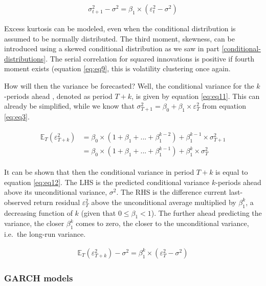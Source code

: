 \documentclass[a4paper, nobind]{templates/ociamthesis}
\begin{document}
\begin{align} 
\sigma_{t+1}^2 - \sigma^2 = \beta_1\times(\varepsilon_t^2 - \sigma^2)
 \label{eq:eq10}
\end{align}

\noindent Excess kurtosis can be modeled, even when the conditional distribution is assumed to be normally distributed. The third moment, skewness, can be introduced using a skewed conditional distribution as we saw in part \ref{conditional-distributions}. The serial correlation for squared innovations is positive if fourth moment exists (equation \eqref{eq:eq9}, this is volatility clustering once again.

\noindent How will then the variance be forecasted? Well, the conditional variance for the \(k\)-periods ahead , denoted as period \(T+k\), is given by equation \eqref{eq:eq11}. This can already be simplified, while we know that \(\sigma_{T+1}^2 = \beta_0 + \beta_1 \times \varepsilon_T^2\) from equation \eqref{eq:eq3}.

\begin{align} 
\begin{split}
\mathbb{E}_T(\varepsilon_{T+k}^2) 
&= \beta_0\times(1+\beta_1 + ... + \beta_1^{k-2}) + \beta_1^{k-1}\times\sigma_{T+1}^2 \\
&= \beta_0\times(1+\beta_1 + ... + \beta_1^{k-1}) + \beta_1^{k}\times\sigma_{T}^2
\end{split}
 \label{eq:eq11}
\end{align}

\noindent It can be shown that then the conditional variance in period \(T+k\) is equal to equation \eqref{eq:eq12}. The LHS is the predicted conditional variance \(k\)-periods ahead above its unconditional variance, \(\sigma^2\). The RHS is the difference current last-observed return residual \(\varepsilon_T^2\) above the unconditional average multiplied by \(\beta_1^k\), a decreasing function of \(k\) (given that \(0 \le\beta_1 <1\)). The further ahead predicting the variance, the closer \(\beta_1^k\) comes to zero, the closer to the unconditional variance, i.e.~the long-run variance.

\begin{align} 
\mathbb{E}_T(\varepsilon_{T+k}^2) - \sigma^2 = \beta_1^k\times(\varepsilon_T^2 - \sigma^2)
 \label{eq:eq12}
\end{align}

\hypertarget{garch-models}{%
\subsubsection{GARCH models}\label{garch-models}}
\end{document}
